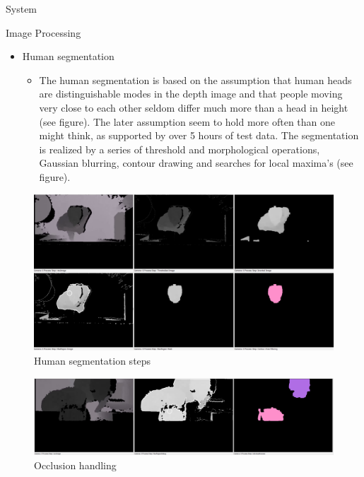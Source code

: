 \documentclass[final,hyperref={pdfpagelabels=false}]{beamer}
\begin{document}
\begin{frame}[t]
\begin{columns}[t]
\begin{column}{.465\textwidth}
\begin{block}{System}
\end{block}


\begin{block}{Image Processing}
\begin{itemize}
	\item Human segmentation
	\begin{itemize}
	\item The human segmentation is based on the assumption that human heads are distinguishable modes in the depth image and that people moving very close to each other seldom differ much more than a head in height (see figure). The later assumption seem to hold more often than one might think, as supported by over 5 hours of test data. The segmentation is realized by a series of threshold and morphological operations, Gaussian blurring, contour drawing and searches for local maxima's (see figure).
	\end{itemize}
\end{itemize}
\begin{figure}
	\includegraphics[width=0.9\linewidth]{humanSegmentationSteps.png}
	\caption{Human segmentation steps}
\end{figure}
\begin{figure}
	\includegraphics[width=0.9\linewidth]{KinectSegmentationIllustration_occlusionHandling_horizontal.png}
	\caption{Occlusion handling}
\end{figure}


\end{block}
\end{column}
\end{columns}
\end{frame}
\end{document}
